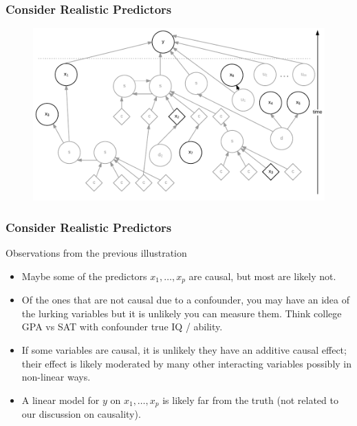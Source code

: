 \documentclass[handout]{beamer}
\begin{document}
\begin{frame}\frametitle{Consider Realistic Predictors}

\begin{figure}
\centering
\includegraphics[width=4.5in]{realistic_predictors}
\end{figure}


\end{frame}

\begin{frame}\frametitle{Consider Realistic Predictors}

Observations from the previous illustration

\begin{itemize}
\item Maybe some of the predictors $x_1, \ldots, x_p$ are causal, but most are likely not.
\item Of the ones that are not causal due to a confounder, you may have an idea of the lurking variables but it is unlikely you can measure them. Think college GPA vs SAT with confounder true IQ / ability.
\item If some variables are causal, it is unlikely they have an additive causal effect; their effect is likely moderated by many other interacting variables possibly in non-linear ways.
\item A linear model for $y$ on $x_1, \ldots, x_p$ is likely far from the truth (not related to our discussion on causality).
\end{itemize}


\end{frame}
\end{document}
